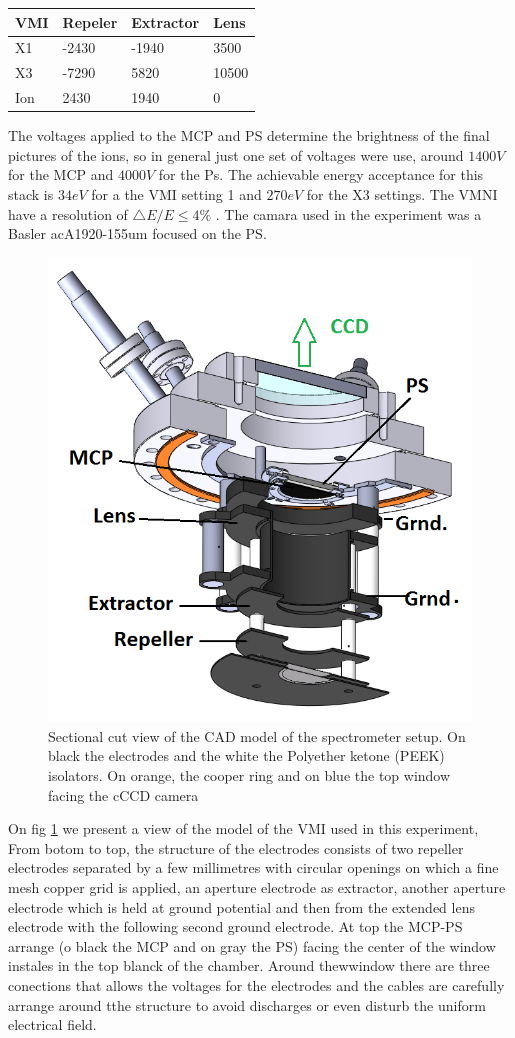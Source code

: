 \begin{table}[]
\centering
\begin{tabular}{|l|l|l|l|}
\hline
\rowcolor[HTML]{EFEFEF} 
VMI & Repeler & Extractor & Lens  \\ \hline
X1  & -2430   & -1940     & 3500  \\ \hline
X3  & -7290   & 5820      & 10500 \\ \hline
Ion & 2430    & 1940      & 0     \\ \hline
\end{tabular}
\end{table}

The voltages applied to the MCP and PS determine the brightness of the final pictures of the ions, so in general just one set of voltages were use, around $1400V$ for the MCP and $4000V$ for the Ps. The achievable energy acceptance for this stack is  $34eV$ for a the VMI setting 1 and $270 eV$ for the X3 settings. The VMNI have a resolution of $\bigtriangleup E / E\leq 4\%$ \cite{schomas_compact_2017}. The camara used in the experiment was a Basler  acA1920-155um focused on the PS.

\begin{figure}[hbtp]
\label{img:mcp cut}
\centering
\includegraphics[width = 8 cm]{../Images/MCP cut.png}
\caption[MCP sketch cut]{Sectional cut view of the CAD model of the spectrometer setup. On black  the electrodes and the white the Polyether ketone (PEEK) isolators. On orange, the cooper ring and on blue the top window facing the cCCD camera
}
\end{figure}

On fig \ref{img:mcp cut} we present a view of the model of the VMI used in this experiment, From botom to top, the structure of the electrodes consists of two repeller electrodes separated by a few millimetres with circular openings on which a fine mesh copper grid is applied, an aperture electrode as extractor, another aperture electrode which is held at ground potential and then from the extended lens electrode with the following second ground electrode. At top  the MCP-PS arrange (o black the MCP and on gray the PS) facing the center of the window instales in the top blanck of the chamber. Around thewwindow there are three conections that allows the voltages for the electrodes and the cables are carefully arrange around tthe structure to avoid discharges or even disturb the uniform electrical field.

